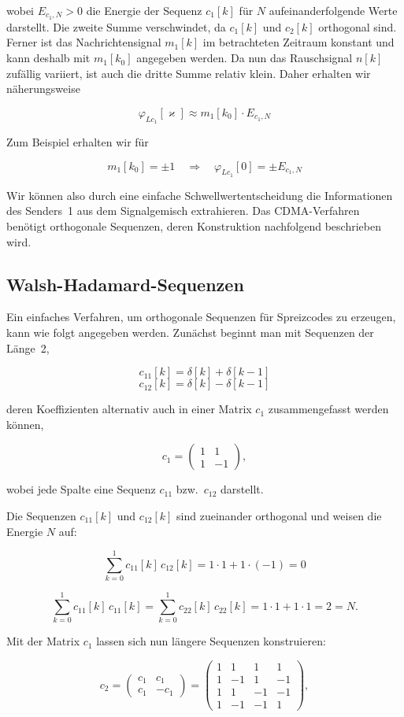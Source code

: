 \begin{beispiel}
wobei $E_{c_1,N} > 0$ die Energie der Sequenz $c_1[k]$ für $N$ aufeinanderfolgende Werte darstellt. Die zweite Summe verschwindet, da $c_1[k]$ und $c_2[k]$ orthogonal sind. Ferner ist das Nachrichtensignal $m_1[k]$ im betrachteten Zeitraum konstant und kann deshalb mit $m_1[k_0]$ angegeben werden. Da nun das Rauschsignal $n[k]$ zufällig variiert, ist auch die dritte Summe relativ klein. Daher erhalten wir näherungsweise

$$
\varphi_{Lc_1}[\varkappa] \approx m_1[k_0] \cdot E_{c_1,N}
$$

Zum Beispiel erhalten wir für

$$
m_1[k_0] = \pm 1 \quad\Rightarrow\quad \varphi_{Lc_1}[0] = \pm E_{c_1,N}
$$

Wir können also durch eine einfache Schwellwertentscheidung die Informationen des Senders~1 aus dem Signalgemisch extrahieren. Das CDMA-Verfahren benötigt orthogonale Sequenzen, deren Konstruktion nachfolgend beschrieben wird.

\subsection*{Walsh-Hadamard-Sequenzen}

Ein einfaches Verfahren, um orthogonale Sequenzen für Spreizcodes zu erzeugen, kann wie folgt angegeben werden. Zunächst beginnt man mit Sequenzen der Länge~2,

$$
c_{11}[k] = \delta[k] + \delta[k-1]
$$
$$
c_{12}[k] = \delta[k] - \delta[k-1]
$$

deren Koeffizienten alternativ auch in einer Matrix $c_1$ zusammengefasst werden können,

$$
c_1 = \begin{pmatrix} 1 & 1 \\ 1 & -1 \end{pmatrix},
$$

wobei jede Spalte eine Sequenz $c_{11}$ bzw.\ $c_{12}$ darstellt.

Die Sequenzen $c_{11}[k]$ und $c_{12}[k]$ sind zueinander orthogonal und weisen die Energie $N$ auf:

$$
\sum_{k=0}^{1} c_{11}[k]\,c_{12}[k] = 1 \cdot 1 + 1 \cdot (-1) = 0
$$

$$
\sum_{k=0}^{1} c_{11}[k]\,c_{11}[k] = \sum_{k=0}^{1} c_{22}[k]\,c_{22}[k] = 1 \cdot 1 + 1 \cdot 1 = 2 = N.
$$

Mit der Matrix $c_1$ lassen sich nun längere Sequenzen konstruieren:

$$
c_2 = \begin{pmatrix} c_1 & c_1 \\ c_1 & -c_1 \end{pmatrix}
= \begin{pmatrix} 1 & 1 & 1 & 1 \\ 1 & -1 & 1 & -1 \\ 1 & 1 & -1 & -1 \\ 1 & -1 & -1 & 1 \end{pmatrix},
$$


\end{beispiel}
